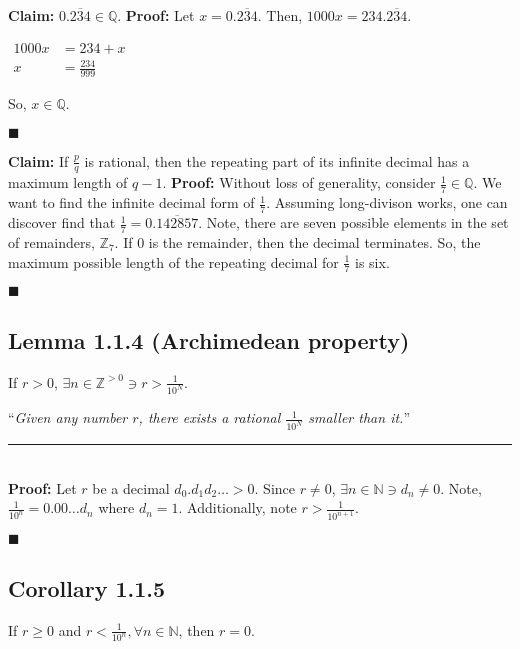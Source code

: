 \documentclass[11pt]{book}
\newcommand{\N}{\mathbb{N}}
\newcommand{\Q}{\mathbb{Q}}
\newcommand{\Z}{\mathbb{Z}}
\newcommand{\horline}{\noindent\rule{14.25cm}{0.6pt}\\}
\newcounter{lemma}
\newcommand{\QED}{\begin{flushright}$\blacksquare$\end{flushright}}
\begin{document}
		\begin{examp}
			\textbf{Claim:} 0.$\overline{234} \in \Q$.\hfill\break
			\textbf{Proof:} Let $x = 0.\overline{234}$. Then, $1000x = 234.\overline{234}$.
			\begin{center}
				\begin{math}
					\begin{aligned}
				1000x & = 234 + x\\
				x & = \frac{234}{999}
					\end{aligned}	
				\end{math}
			\end{center}
			So, $x \in \Q$. \QED
		\end{examp}

		\begin{examp}
			\textbf{Claim:} If $\frac{p}{q}$ is rational, then the repeating part of its
			infinite decimal has a maximum length of $q-1$.\hfill\break
			\textbf{Proof:} Without loss of generality, consider $\frac{1}{7} \in \Q$. We want
			to find the infinite decimal form of $\frac{1}{7}$. Assuming long-divison works,
			one can discover find that $\frac{1}{7} = 0.\overline{142857}$.\hfill\break
			Note, there are seven possible elements in the set of remainders, $\Z_7$. 
			If 0 is the remainder, then the decimal terminates. So, the maximum possible length
			of the repeating decimal for $\frac{1}{7}$ is six. \QED
		\end{examp}

	\subsection{Lemma 1.1.4 (Archimedean property)}
	\label{subsec:lemma114}
		\begin{lemm}
			If $r > 0$, $\exists n \in \mathbb{Z}^{>0} \ni r > \frac{1}{10^N}$.

			``\emph{Given any number $r$, there exists a rational $\frac{1}{10^N}$ smaller than it.}''\hfill\break
			\horline
			\textbf{Proof:} Let $r$ be a decimal $d_0.d_1d_2\dots > 0$. Since $r \neq 0$,\hfill\break
			$\exists n \in \N \ni d_n \neq 0$. Note, $\frac{1}{10^n} = 0.00\dots d_n$ where\hfill\break
			$d_n = 1$. Additionally, note $r > \frac{1}{10^{n+1}}$. \QED

		\end{lemm}
	\subsection{Corollary 1.1.5}
	\label{subsec:cor115}
		\begin{cor}
			If $r \geq 0$ and $r < \frac{1}{10^n}, \forall n \in \N$, then $r = 0$.
		\end{cor}
\end{document}
